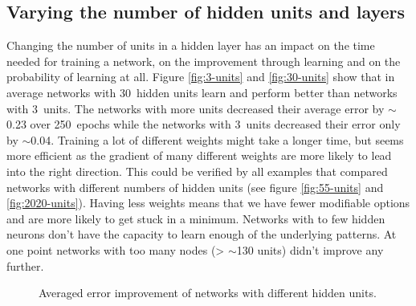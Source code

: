 \documentclass[12pt, a4paper]{article}
\begin{document}
\subsection*{Varying the number of hidden units and layers}

Changing the number of units in a hidden layer has an impact on the time needed for training a network, on the improvement through learning and on the probability of learning at all. Figure \ref{fig:3-units} and \ref{fig:30-units} show that in average networks with 30~hidden units learn and perform better than networks with 3~units. The networks with more units decreased their average error by $\sim$0.23 over 250~epochs while the networks with 3~units decreased their error only by $\sim$0.04. Training a lot of different weights might take a longer time, but seems more efficient as the gradient of many different weights are more likely to lead into the right direction. This could be verified by all examples that compared networks with different numbers of hidden units (see figure \ref{fig:55-units} and \ref{fig:2020-units}). Having less weights means that we have fewer modifiable options and are more likely to get stuck in a minimum. Networks with to few hidden neurons don't have the capacity to learn enough of the underlying patterns. At one point networks with too many nodes (> $\sim$130 units) didn't improve any further.
\begin{figure}[htbp]
	\caption{Averaged error improvement of networks with different hidden units.}
	\label{fig:average-vary-units}
\end{figure}
\end{document}
